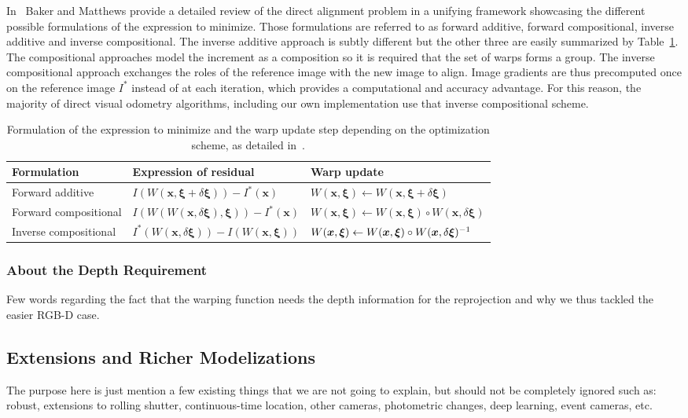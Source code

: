 In~\cite{baker2004lucas} Baker and Matthews provide a detailed review of the direct
alignment problem in a unifying framework showcasing the different possible formulations
of the expression to minimize.
Those formulations are referred to as forward additive, forward compositional,
inverse additive and inverse compositional.
The inverse additive approach is subtly different but the other three are
easily summarized by Table~\ref{tab:image-alignment-method}.
The compositional approaches model the increment as a composition
so it is required that the set of warps forms a group.
The inverse compositional approach exchanges the roles of the reference image
with the new image to align.
Image gradients are thus precomputed once on the reference image $I^{*}$
instead of at each iteration,
which provides a computational and accuracy advantage.
For this reason, the majority of direct visual odometry algorithms,
including our own implementation use that inverse compositional scheme.


\begin{table}[ht]
\centering
\begin{tabular}{lll}
Formulation
	& Expression of residual
    & Warp update\\
    \midrule
Forward additive
	& $I(W(\bm{x}, \bm{\xi} + \delta \bm{\xi})) - I^{*}(\bm{x})$
	& $W(\bm{x}, \bm{\xi}) \leftarrow W(\bm{x}, \bm{\xi} + \delta \bm{\xi})$\\
Forward compositional
	& $I(W(W(\bm{x}, \delta \bm{\xi}), \bm{\xi})) - I^{*}(\bm{x})$
	& $W(\bm{x}, \bm{\xi}) \leftarrow W(\bm{x}, \bm{\xi}) \circ W(\bm{x}, \delta \bm{\xi})$\\
Inverse compositional
	& $I^{*}(W(\bm{x}, \delta \bm{\xi})) - I(W(\bm{x}, \bm{\xi}))$
	& $W(\bm{x}, \bm{\xi}) \leftarrow W(\bm{x}, \bm{\xi}) \circ W(\bm{x}, \delta \bm{\xi})^{-1}$\\
\end{tabular}

\caption{Formulation of the expression to minimize and the warp update step
	depending on the optimization scheme, as detailed in~\cite{baker2004lucas}.}%
\label{tab:image-alignment-method}
\end{table}

\subsubsection{About the Depth Requirement}%
\label{ssub:depth_requirement}

Few words regarding the fact that the warping function needs the depth information
for the reprojection and why we thus tackled the easier RGB-D case.

\subsection{Extensions and Richer Modelizations}%
\label{sub:vo_extensions}

The purpose here is just mention a few existing things that we are not going to explain,
but should not be completely ignored such as:
robust, extensions to rolling shutter, continuous-time location, other cameras, photometric changes,
deep learning, event cameras, etc.
